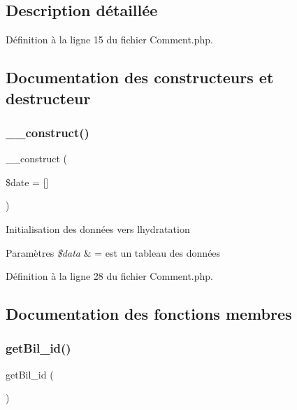 \subsection{Description détaillée}


Définition à la ligne 15 du fichier Comment.\+php.



\subsection{Documentation des constructeurs et destructeur}
\mbox{\label{class_src_1_1_entity_1_1_comment_a594620c0e8c7693172eee4901c0b7705}} 
\subsubsection{\texorpdfstring{\+\_\+\+\_\+construct()}{\_\_construct()}}
{\footnotesize\ttfamily \+\_\+\+\_\+construct (\begin{DoxyParamCaption}\item[{}]{\$date = {\ttfamily \mbox{[}\mbox{]}} }\end{DoxyParamCaption})}

Initialisation des données vers l\textquotesingle{}hydratation 
\begin{DoxyParams}{Paramètres}
{\em \$data} & = est un tableau des données \\
\hline
\end{DoxyParams}


Définition à la ligne 28 du fichier Comment.\+php.



\subsection{Documentation des fonctions membres}
\mbox{\label{class_src_1_1_entity_1_1_comment_a1df6ee009c81d0d807d36d18d40b9e97}} 
\subsubsection{\texorpdfstring{get\+Bil\+\_\+id()}{getBil\_id()}}
{\footnotesize\ttfamily get\+Bil\+\_\+id (\begin{DoxyParamCaption}{ }\end{DoxyParamCaption})}



